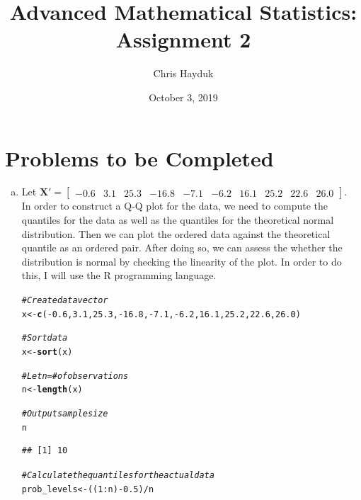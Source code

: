 \documentclass[12pt]{article}\usepackage[]{graphicx}\usepackage[]{color}
\makeatletter
\newcommand{\hlnum}[1]{\textcolor[rgb]{0.686,0.059,0.569}{#1}}%
\newcommand{\hlcom}[1]{\textcolor[rgb]{0.678,0.584,0.686}{\textit{#1}}}%
\newcommand{\hlopt}[1]{\textcolor[rgb]{0,0,0}{#1}}%
\newcommand{\hlstd}[1]{\textcolor[rgb]{0.345,0.345,0.345}{#1}}%
\newcommand{\hlkwb}[1]{\textcolor[rgb]{0.69,0.353,0.396}{#1}}%
\newcommand{\hlkwd}[1]{\textcolor[rgb]{0.737,0.353,0.396}{\textbf{#1}}}%
\newenvironment{kframe}{%
 \def\at@end@of@kframe{}%
 \ifinner\ifhmode%
  \def\at@end@of@kframe{\end{minipage}}%
  \begin{minipage}{\columnwidth}%
 \fi\fi%
 \def\FrameCommand##1{\hskip\@totalleftmargin \hskip-\fboxsep
 \colorbox{shadecolor}{##1}\hskip-\fboxsep
     \hskip-\linewidth \hskip-\@totalleftmargin \hskip\columnwidth}%
 \MakeFramed {\advance\hsize-\width
   \@totalleftmargin\z@ \linewidth\hsize
   \@setminipage}}%
 {\par\unskip\endMakeFramed%
 \at@end@of@kframe}
\newenvironment{knitrout}{}{} %
\newenvironment{problem}[2][Problem]{\begin{trivlist}
\item[\hskip \labelsep {\bfseries #1}\hskip \labelsep {\bfseries #2.}]}{\end{trivlist}}
\newcommand{\vct}{\mathbf}
\makeatother
\begin{document}
\title{Advanced Mathematical Statistics: Assignment 2}

\author{Chris Hayduk}
\date{October 3, 2019}

\maketitle



\section{Problems to be Completed}

\begin{problem}{4.23}
\end{problem}

\begin{enumerate}[a)]

\item Let $\vct{X}' = \begin{bmatrix} -0.6 & 3.1 & 25.3 & -16.8 & -7.1 & -6.2 & 16.1 & 25.2 & 22.6 & 26.0 \end{bmatrix}$.\\

In order to construct a Q-Q plot for the data, we need to compute the quantiles for the data as well as the quantiles for the theoretical normal distribution. Then we can plot the ordered data against the theoretical quantile as an ordered pair. After doing so, we can assess the whether the distribution is normal by checking the linearity of the plot. In order to do this, I will use the R programming language.

\begin{knitrout}
\color{fgcolor}\begin{kframe}
\begin{alltt}
\hlcom{#Create data vector}
\hlstd{x} \hlkwb{<-} \hlkwd{c}\hlstd{(}\hlopt{-}\hlnum{0.6}\hlstd{,} \hlnum{3.1}\hlstd{,} \hlnum{25.3}\hlstd{,} \hlopt{-}\hlnum{16.8}\hlstd{,} \hlopt{-}\hlnum{7.1}\hlstd{,} \hlopt{-}\hlnum{6.2}\hlstd{,} \hlnum{16.1}\hlstd{,} \hlnum{25.2}\hlstd{,} \hlnum{22.6}\hlstd{,} \hlnum{26.0}\hlstd{)}

\hlcom{#Sort data}
\hlstd{x} \hlkwb{<-} \hlkwd{sort}\hlstd{(x)}

\hlcom{#Let n = # of observations}
\hlstd{n} \hlkwb{<-} \hlkwd{length}\hlstd{(x)}

\hlcom{#Output sample size}
\hlstd{n}
\end{alltt}
\begin{verbatim}
## [1] 10
\end{verbatim}
\begin{alltt}
\hlcom{#Calculate the quantiles for the actual data}
\hlstd{prob_levels} \hlkwb{<-} \hlstd{((}\hlnum{1}\hlopt{:}\hlstd{n)}\hlopt{-}\hlnum{0.5}\hlstd{)}\hlopt{/}\hlstd{n}


\end{alltt}
\end{kframe}
\end{knitrout}
\end{enumerate}
\end{document}
